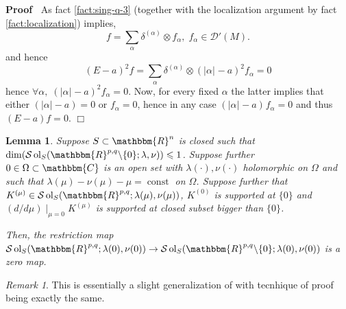 \documentclass{article}
\newcommand{\tmop}[1]{\ensuremath{\operatorname{#1}}}
\renewenvironment{proof}{\noindent\textbf{Proof\ }}{\hspace*{\fill}$\Box$\medskip}
\newtheorem{lemma}[proposition]{Lemma}
\theoremstyle{remark}
\newtheorem{remark}[proposition]{Remark}
\begin{document}
\begin{proof}
  As fact \ref{fact:sing-q-3} (together with the localization argument by fact
  \ref{fact:localization}) implies,
  \[ f = \sum_{\alpha} \delta^{(\alpha)} \otimes f_{\alpha}, \; f_{\alpha} \in
     \mathcal{D}' (M) . \]
  and hence
  \[ (E - a)^2 f = \sum_{\alpha} \delta^{(\alpha)} \otimes (| \alpha |^{} -
     a)^2 f_{\alpha} = 0 \]
  hence $\forall \alpha, \; (| \alpha |^{} - a)^2 f_{\alpha} = 0$. Now, for
  every fixed $\alpha$ the latter implies that either $(| \alpha | - a) = 0$
  or $f_{\alpha} = 0$, hence in any case $(| \alpha |^{} - a)^{} f_{\alpha} =
  0$ and thus $(E - a) f = 0$.
\end{proof}

\begin{lemma}
  \label{sol-MO:lem-zeromap-point}Suppose $S \subset \mathbbm{R}^n$ is closed
  such that $\dim (\mathcal{S} \tmop{ol}_S (\mathbbm{R}^{p, q} \backslash \{ 0
  \} ; \lambda, \nu)) \leqslant 1$. Suppose further $0 \in \Omega \subset
  \mathbbm{C}$ is an open set with $\lambda (\cdot), \nu (\cdot)$ holomorphic
  on $\Omega$ and such that $\lambda (\mu) - \nu (\mu) - \mu = \tmop{const}$
  on $\Omega$. Suppose further that $K^{(\mu)} \in \mathcal{S} \tmop{ol}_S
  (\mathbbm{R}^{p, q} ; \lambda (\mu), \nu (\mu))$, $K^{(0)}$ is supported
  at $\{ 0 \}$ and $(d / d \mu) \mid_{\mu = 0} K^{(\mu)}$ is supported
  at closed subset bigger than $\{ 0 \}$.
  
  Then, the restriction map $\mathcal{S} \tmop{ol}_S (\mathbbm{R}^{p, q} ;
  \lambda (0), \nu (0)) \rightarrow \mathcal{S} \tmop{ol}_S (\mathbbm{R}^{p,
  q} \backslash \{ 0 \} ; \lambda (0), \nu (0))$ is a zero map.
\end{lemma}

\begin{remark}
  This is essentially a slight generalization of {\cite[lemma
  11.8]{kobayashi2015symmetry}} with tecnhique of proof being exactly the
  same.
\end{remark}
\end{document}
